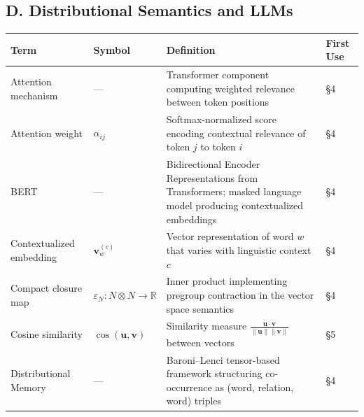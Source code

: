 \documentclass[
]{article}
\newcounter{none} %
\numberwithin{equation}{section}
\begin{document}
\subsection{D. Distributional Semantics and
LLMs}\label{d.-distributional-semantics-and-llms}

{\def\LTcaptype{none} %
\begin{longtable}[]{@{}
  >{\raggedright\arraybackslash}p{}
  >{\centering\arraybackslash}p{}
  >{\raggedright\arraybackslash}p{}
  >{\centering\arraybackslash}p{}@{}}
\toprule\noalign{}
\begin{minipage}[b]{\linewidth}\raggedright
Term
\end{minipage} & \begin{minipage}[b]{\linewidth}\centering
Symbol
\end{minipage} & \begin{minipage}[b]{\linewidth}\raggedright
Definition
\end{minipage} & \begin{minipage}[b]{\linewidth}\centering
First Use
\end{minipage} \\
\midrule\noalign{}
\endhead
\bottomrule\noalign{}
\endlastfoot
Attention mechanism & --- & Transformer component computing weighted
relevance between token positions & §4 \\
Attention weight & \(\alpha_{ij}\) & Softmax-normalized score encoding
contextual relevance of token \(j\) to token \(i\) & §4 \\
BERT & --- & Bidirectional Encoder Representations from Transformers;
masked language model producing contextualized embeddings & §4 \\
Contextualized embedding & \(\mathbf{v}_w^{(c)}\) & Vector
representation of word \(w\) that varies with linguistic context \(c\) &
§4 \\
Compact closure map & \(\varepsilon_N: N \otimes N \to \mathbb{R}\) &
Inner product implementing pregroup contraction in the vector space
semantics & §4 \\
Cosine similarity & \(\cos(\mathbf{u}, \mathbf{v})\) & Similarity
measure
\(\frac{\mathbf{u} \cdot \mathbf{v}}{\|\mathbf{u}\| \|\mathbf{v}\|}\)
between vectors & §5 \\
Distributional Memory & --- & Baroni--Lenci tensor-based framework
structuring co-occurrence as (word, relation, word) triples & §4 \\

\end{longtable}}
\end{document}
